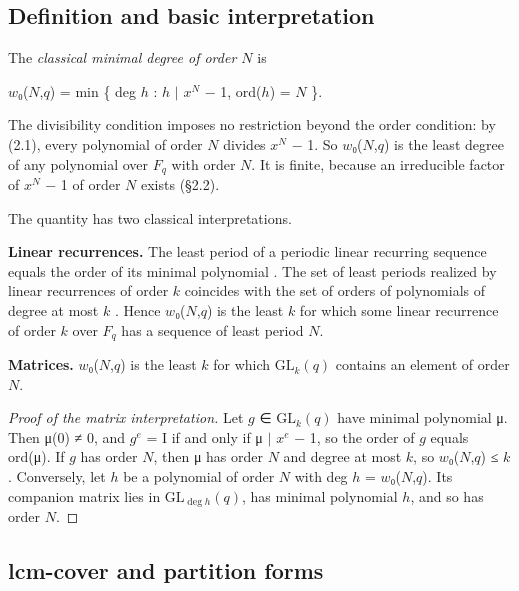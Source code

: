 \documentclass[pdflatex,sn-mathphys-num]{sn-jnl}
\theoremstyle{thmstyleone}
\theoremstyle{thmstylethree}
\begin{document}
\subsection{Definition and basic interpretation}

The \emph{classical minimal degree of order \(N\)} is

\begin{center}\(w\)₀(\(N\),\(q\)) = min \{ deg \(h\) : \(h\) \(\mid\) \(x^N\) − 1, ord(\(h\)) = \(N\) \}.\end{center}

The divisibility condition imposes no restriction beyond the order condition: by (2.1), every polynomial of order \(N\) divides \(x^N\) − 1. So \(w\)₀(\(N\),\(q\)) is the least degree of any polynomial over \(F_q\) with order \(N\). It is finite, because an irreducible factor of \(x^N\) − 1 of order \(N\) exists (§2.2).

The quantity has two classical interpretations.

\textbf{Linear recurrences.} The least period of a periodic linear recurring sequence equals the order of its minimal polynomial \cite{LN}. The set of least periods realized by linear recurrences of order \(k\) coincides with the set of orders of polynomials of degree at most \(k\) \cite{BQ}. Hence \(w\)₀(\(N\),\(q\)) is the least \(k\) for which some linear recurrence of order \(k\) over \(F_q\) has a sequence of least period \(N\).

\textbf{Matrices.} \(w\)₀(\(N\),\(q\)) is the least \(k\) for which \(\mathrm{GL}_k(q)\) contains an element of order \(N\).

\begin{proof}[Proof of the matrix interpretation]

Let \(g\) ∈ \(\mathrm{GL}_k(q)\) have minimal polynomial μ. Then μ(0) ≠ 0, and \(g^e\) = I if and only if μ \(\mid\) \(x^e\) − 1, so the order of \(g\) equals ord(μ). If \(g\) has order \(N\), then μ has order \(N\) and degree at most \(k\), so \(w\)₀(\(N\),\(q\)) ≤ \(k\). Conversely, let \(h\) be a polynomial of order \(N\) with deg \(h\) = \(w\)₀(\(N\),\(q\)). Its companion matrix lies in \(\mathrm{\mathrm{GL}}_{\deg h}(q)\), has minimal polynomial \(h\), and so has order \(N\).

\end{proof}

\subsection{lcm-cover and partition forms}
\end{document}
